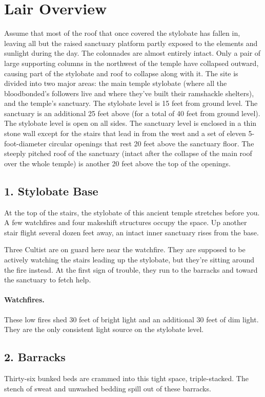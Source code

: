 \documentclass[10pt,a4paper,twoside,twocolumn,openany,bg=print,nodeprecatedcode]{dndbook}
\begin{document}
\section{Lair Overview}
Assume that most of the roof that once covered the stylobate has fallen in, leaving all but the raised sanctuary platform partly exposed to the elements and sunlight during the day. The colonnades are almost entirely intact. Only a pair of large supporting columns in the northwest of the temple have collapsed outward, causing part of the stylobate and roof to collapse along with it.
The site is divided into two major areas: the main temple stylobate (where all the bloodbonded's followers live and where they've built their ramshackle shelters), and the temple's sanctuary. The stylobate level is 15 feet from ground level. The sanctuary is an additional 25 feet above (for a total of 40 feet from ground level). The stylobate level is open on all sides. The sanctuary level is enclosed in a thin stone wall except for the stairs that lead in from the west and a set of eleven 5-foot-diameter circular openings that rest 20 feet above the sanctuary floor. The steeply pitched roof of the sanctuary (intact after the collapse of the main roof over the whole temple) is another 20 feet above the top of the openings.
\subsection{1. Stylobate Base}
\begin{DndReadAloud}{}
At the top of the stairs, the stylobate of this ancient temple stretches before you. A few watchfires and four makeshift structures occupy the space. Up another stair flight several dozen feet away, an intact inner sanctuary rises from the base.
\end{DndReadAloud}

Three Cultist are on guard here near the watchfire. They are supposed to be actively watching the stairs leading up the stylobate, but they're sitting around the fire instead. At the first sign of trouble, they run to the barracks and toward the sanctuary to fetch help.
\paragraph{Watchfires.}
These low fires shed 30 feet of bright light and an additional 30 feet of dim light. They are the only consistent light source on the stylobate level.
\subsection{2. Barracks}
\begin{DndReadAloud}{}
Thirty-six bunked beds are crammed into this tight space, triple-stacked. The stench of sweat and unwashed bedding spill out of these barracks.
\end{DndReadAloud}
\end{document}

